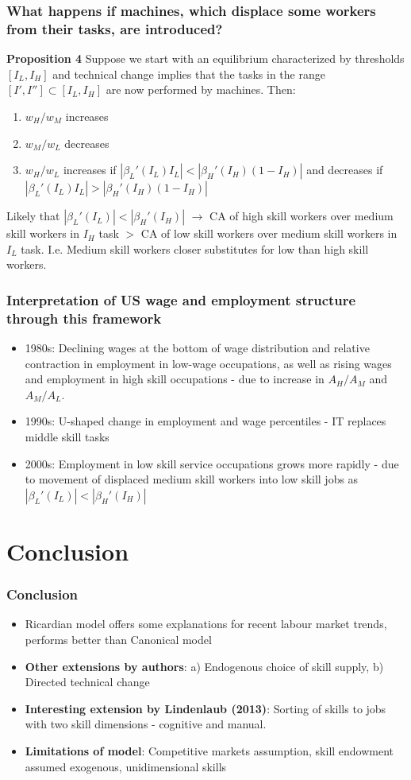 \documentclass[mathserif]{beamer}
\begin{document}
\begin{frame}
\frametitle{What happens if machines, which displace some workers from their tasks, are introduced?}
\textbf{Proposition 4} Suppose we start with an equilibrium characterized by thresholds $[I_L,I_H]$ and technical change implies that the tasks in the range $[I',I'']\subset[I_L,I_H]$ are now performed by machines. Then:
\begin{enumerate}
\item $w_H/w_M$ increases
\item $w_M/w_L$ decreases
\item $w_H/w_L$ increases if $|\beta_L'(I_L)I_L|<|\beta_H'(I_H)(1-I_H)|$ and decreases if $|\beta_L'(I_L)I_L|> |\beta_H'(I_H)(1-I_H)|$
\end{enumerate}
Likely that $|\beta_L'(I_L)|<|\beta_H'(I_H)|$ $\rightarrow$  CA of high skill workers over medium skill workers in $I_H$ task $>$ CA of low skill workers over medium skill workers in $I_L$ task. I.e. Medium skill workers closer substitutes for low than high skill workers.
\end{frame}
\begin{frame}
\frametitle{Interpretation of US wage and employment structure through this framework}
\begin{itemize}
\item 1980s: Declining wages at the bottom of wage distribution and relative contraction in employment in low-wage occupations, as well as rising wages and employment in high skill occupations - due to increase in $A_H/A_M$ and $A_M/A_L$.
\item 1990s: U-shaped change in employment and wage percentiles - IT replaces middle skill tasks
\item 2000s: Employment in low skill service occupations grows more rapidly - due to movement of displaced medium skill workers into low skill jobs as $|\beta_L'(I_L)|<|\beta_H'(I_H)|$
\end{itemize}
\end{frame}
\section{Conclusion}
\begin{frame}
\frametitle{Conclusion}
\begin{itemize}
\item Ricardian model offers some explanations for recent labour market trends, performs better than Canonical model
\item \textbf{Other extensions by authors}: a) Endogenous choice of skill supply, b) Directed technical change
\item \textbf{Interesting extension by Lindenlaub (2013)}: Sorting of skills to jobs  with two skill dimensions - cognitive and manual.
\item \textbf{Limitations of model}: Competitive markets assumption, skill endowment assumed exogenous, unidimensional skills
\end{itemize}
\end{frame}
\end{document}
